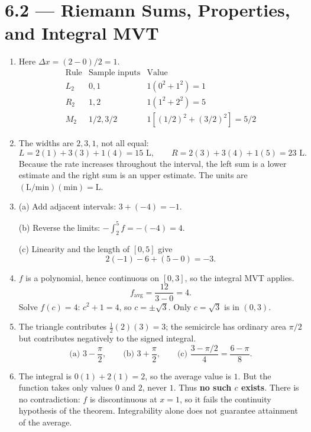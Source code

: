 \documentclass[11pt]{article}
\newcommand{\topic}[2]{\clearpage\section*{#1 --- #2}}
\begin{document}
\topic{6.2}{Riemann Sums, Properties, and Integral MVT}
\begin{enumerate}
\item Here $\Delta x=(2-0)/2=1$.
\[
\begin{array}{c|c|c}
\text{Rule}&\text{Sample inputs}&\text{Value}\\\hline
L_2&0,1&1(0^2+1^2)=\boxed1\\
R_2&1,2&1(1^2+2^2)=\boxed5\\
M_2&1/2,3/2&1[(1/2)^2+(3/2)^2]=\boxed{5/2}
\end{array}
\]
\item The widths are $2,3,1$, not all equal:
\[
L=2(1)+3(3)+1(4)=\boxed{15\text{ L}},\qquad
R=2(3)+3(4)+1(5)=\boxed{23\text{ L}}.
\]
Because the rate increases throughout the interval, the left sum is a lower estimate and the right sum is an upper estimate. The units are $(\text{L/min})(\text{min})=\text{L}$.
\item (a) Add adjacent intervals: $3+(-4)=\boxed{-1}$.

(b) Reverse the limits: $-\int_2^5 f=-(-4)=\boxed4$.

(c) Linearity and the length of $[0,5]$ give
\[
2(-1)-6+(5-0)=\boxed{-3}.
\]
\item $f$ is a polynomial, hence continuous on $[0,3]$, so the integral MVT applies.
\[
f_{\mathrm{avg}}=\frac{12}{3-0}=\boxed4.
\]
Solve $f(c)=4$: $c^2+1=4$, so $c=\pm\sqrt3$.
Only $\boxed{c=\sqrt3}$ is in $(0,3)$.
\item The triangle contributes $\frac12(2)(3)=3$; the semicircle has ordinary area $\pi/2$ but contributes negatively to the signed integral.
\[
\text{(a) }\boxed{3-\frac\pi2},\qquad
\text{(b) }\boxed{3+\frac\pi2},\qquad
\text{(c) }\boxed{\frac{3-\pi/2}{4}=\frac{6-\pi}{8}}.
\]
\item The integral is $0(1)+2(1)=2$, so the average value is $\boxed1$.
But the function takes only values $0$ and $2$, never $1$. Thus \textbf{no such $c$ exists}.
There is no contradiction: $f$ is discontinuous at $x=1$, so it fails the continuity hypothesis of the theorem. Integrability alone does not guarantee attainment of the average.
\end{enumerate}
\end{document}
